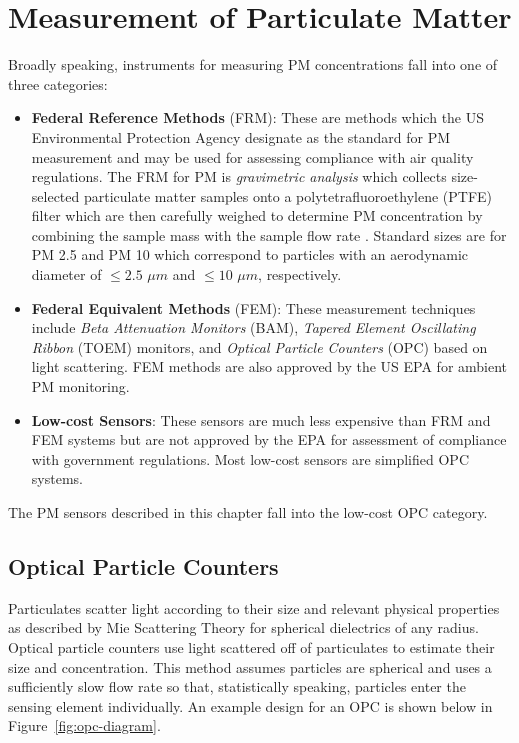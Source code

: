 \section{Measurement of Particulate Matter}

Broadly speaking, instruments for measuring PM concentrations fall into one of
three categories:
\begin{itemize}
  \item \textbf{Federal Reference Methods} (FRM): These are methods which the US
    Environmental Protection Agency designate as the standard for PM measurement
    and may be used for assessing compliance with air quality regulations. The
    FRM for PM is \textit{gravimetric analysis} which collects size-selected
    particulate matter samples onto a polytetrafluoroethylene (PTFE) filter which are
    then carefully weighed to determine PM concentration by combining the sample
    mass with the sample flow rate \cite{pm-federal-reference-method}. Standard
    sizes are for PM 2.5 and PM 10 which correspond to particles with an
    aerodynamic diameter of $\leq 2.5$ $\mu m$ and $\leq 10$ $\mu m$, respectively.
  \item \textbf{Federal Equivalent Methods} (FEM): These measurement techniques
    include \textit{Beta Attenuation Monitors}  (BAM), \textit{Tapered Element
      Oscillating Ribbon} (TOEM) monitors, and \textit{Optical Particle
      Counters} (OPC) based on light scattering. FEM methods are also approved
    by the US EPA for ambient PM monitoring.
  \item \textbf{Low-cost Sensors}: These sensors are much less expensive than
    FRM and FEM systems but are not approved by the EPA for assessment of
    compliance with government regulations. Most low-cost sensors are simplified
    OPC systems.
\end{itemize}
The PM sensors described in this chapter fall into the low-cost OPC category.

\subsection{Optical Particle Counters}

Particulates scatter light according to their size and relevant physical
properties as described by Mie Scattering Theory for spherical dielectrics of
any radius. Optical particle
counters use light scattered off of particulates to estimate their size and
concentration. This method assumes particles are spherical and uses a
sufficiently slow flow rate so that, statistically speaking, particles enter the
sensing element individually. An example design for an OPC is shown below in
Figure~\ref{fig:opc-diagram}.

